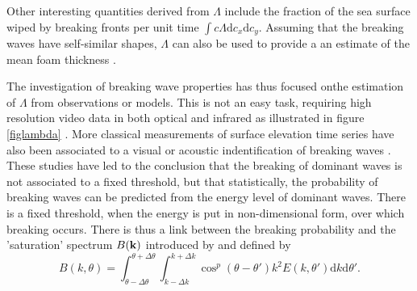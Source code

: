 Other interesting quantities derived from $\Lambda$ include the fraction of the sea surface 
wiped by breaking fronts per unit time $\int c \Lambda {\mathrm d}c_x {\mathrm
d}c_y$. Assuming that the breaking waves have self-similar shapes, $\Lambda$ can also be used to 
provide a an estimate of the mean foam thickness \citep{Reul&Chapron2003}.

The investigation of breaking wave properties has thus focused onthe 
estimation of $\Lambda$ from observations or models. This is not an easy task, requiring 
high resolution video data in both optical and infrared as illustrated in figure \ref{figlambda} \citep[e.g.][]{Sutherland&Melville2013}.
More classical measurements of surface elevation time series have also been associated to a visual or acoustic 
indentification of breaking waves \citep{Banner&al.2000,Babanin&al.2001,Manasseh&al.2006}. These studies 
have led to the conclusion that the breaking of dominant waves is not associated to a fixed threshold, but that statistically,
the probability of breaking waves can be predicted from the energy level of dominant waves. 
There is a fixed threshold, when the energy is put in non-dimensional form, over which breaking occurs. 
There is thus a link between the breaking probability and the 'saturation' spectrum $B(\mathbf{k})$ introduced by \cite{Phillips1985} and 
defined by
\begin{equation}
B\left(k,\theta\right)=\int_{\theta - \Delta \theta}^{{\theta +
\Delta \theta}} \int_{k-\Delta k}^{k+\Delta k}
\cos^p(\theta-\theta') k^2 E(k,\theta') \mathrm d k \mathrm d
\theta' \label{defBofk}.
\end{equation}
